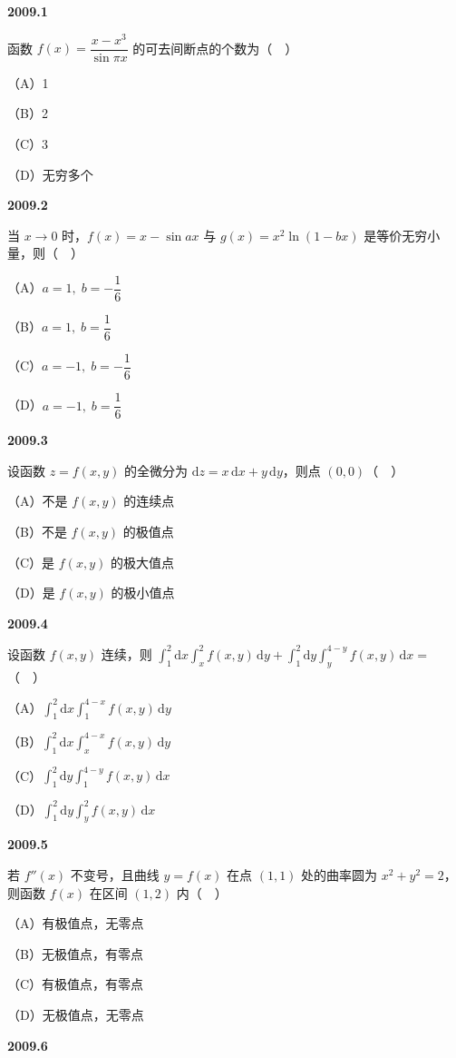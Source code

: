 \documentclass[UTF8,12pt,fontset=windows]{ctexart}
\begin{document}
{\large\bfseries 2009.1}

函数 $f(x) = \dfrac{x - x^3}{\sin \pi x}$ 的可去间断点的个数为（　）

（A）1

（B）2

（C）3

（D）无穷多个

\vfill
\newpage
{\large\bfseries 2009.2}

当 $x \to 0$ 时，$f(x) = x - \sin ax$ 与 $g(x) = x^2 \ln(1 - bx)$ 是等价无穷小量，则（　）

（A）$a = 1, \; b = -\dfrac{1}{6}$

（B）$a = 1, \; b = \dfrac{1}{6}$

（C）$a = -1, \; b = -\dfrac{1}{6}$

（D）$a = -1, \; b = \dfrac{1}{6}$

\vfill
\newpage
{\large\bfseries 2009.3}

设函数 $z = f(x, y)$ 的全微分为 $\mathrm{d}z = x\,\mathrm{d}x + y\,\mathrm{d}y$，则点 $(0, 0)$（　）

（A）不是 $f(x, y)$ 的连续点

（B）不是 $f(x, y)$ 的极值点

（C）是 $f(x, y)$ 的极大值点

（D）是 $f(x, y)$ 的极小值点

\vfill
\newpage
{\large\bfseries 2009.4}

设函数 $f(x, y)$ 连续，则 $\int_1^2 \mathrm{d}x \int_x^2 f(x, y) \,\mathrm{d}y + \int_1^2 \mathrm{d}y \int_y^{4-y} f(x, y) \,\mathrm{d}x =$（　）

（A）$\int_1^2 \mathrm{d}x \int_1^{4-x} f(x, y) \,\mathrm{d}y$

（B）$\int_1^2 \mathrm{d}x \int_x^{4-x} f(x, y) \,\mathrm{d}y$

（C）$\int_1^2 \mathrm{d}y \int_1^{4-y} f(x, y) \,\mathrm{d}x$

（D）$\int_1^2 \mathrm{d}y \int_y^{2} f(x, y) \,\mathrm{d}x$

\vfill
\newpage
{\large\bfseries 2009.5}

若 $f''(x)$ 不变号，且曲线 $y = f(x)$ 在点 $(1, 1)$ 处的曲率圆为 $x^2 + y^2 = 2$，则函数 $f(x)$ 在区间 $(1, 2)$ 内（　）

（A）有极值点，无零点

（B）无极值点，有零点

（C）有极值点，有零点

（D）无极值点，无零点

\vfill
\newpage
{\large\bfseries 2009.6}
\end{document}
